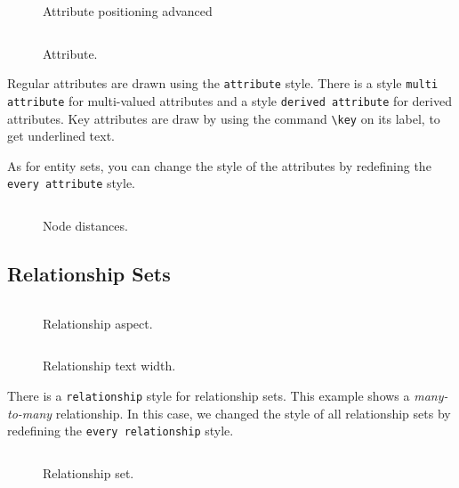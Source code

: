 \documentclass[12pt]{article}
\newcommand{\demo}[1]{
  \bigskip
  \begin{minipage}{\linewidth}
      \begin{center}
          
      \end{center}
      \begin{center}
          \scriptsize
          \inputminted{latex}{snippets/#1.tex}
      \end{center}
  \end{minipage}
}
\begin{document}
\begin{figure}[htb!]
    \centering
    \demo{attribute-positioning-advanced}
    \caption{Attribute positioning advanced}
\label{fig:attribute-positioning-advanced}
\end{figure}

\begin{figure}[htb!]
    \centering
    \demo{attribute}
    \caption{Attribute.}
\label{fig:attribute}
\end{figure}

Regular attributes are drawn using the \texttt{attribute} style. There is a
style \texttt{multi attribute} for multi-valued attributes and a style
\texttt{derived attribute} for derived attributes. Key attributes are draw by
using the command \verb+\key+ on its label, to get underlined text.

As for entity sets, you can change the style of the attributes by redefining the
\texttt{every attribute} style.

\begin{figure}[htb!]
    \centering
    \demo{node-distances}
    \caption{Node distances.}
\label{fig:node-distances}
\end{figure}

%

\subsection{Relationship Sets}
\label{sec:relationships}

\begin{figure}[htb!]
    \centering
    \demo{relationship-aspect}
    \caption{Relationship aspect.}
\label{fig:relationship-aspect}
\end{figure}

\begin{figure}[htb!]
    \centering
    \demo{relationship-text-width}
    \caption{Relationship text width.}
\label{fig:relationship-text-width}
\end{figure}

There is a \texttt{relationship} style for relationship sets. This example
shows a \emph{many-to-many} relationship. In this case, we changed the style of
all relationship sets by redefining the \texttt{every relationship} style.

\begin{figure}[htb!]
    \centering
    \demo{relationshipM-M}
    \caption{Relationship set.}
\label{fig:relationship}
\end{figure}
\end{document}
